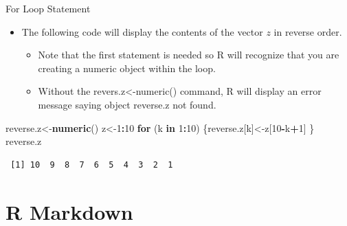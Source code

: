\documentclass[
  ignorenonframetext,
]{beamer}
\newenvironment{Shaded}{\begin{snugshade}}{\end{snugshade}}
\newcommand{\ControlFlowTok}[1]{\textcolor[rgb]{0.13,0.29,0.53}{\textbf{#1}}}
\newcommand{\DecValTok}[1]{\textcolor[rgb]{0.00,0.00,0.81}{#1}}
\newcommand{\FunctionTok}[1]{\textcolor[rgb]{0.13,0.29,0.53}{\textbf{#1}}}
\newcommand{\NormalTok}[1]{#1}
\newcommand{\OtherTok}[1]{\textcolor[rgb]{0.56,0.35,0.01}{#1}}
\newcommand{\SpecialCharTok}[1]{\textcolor[rgb]{0.81,0.36,0.00}{\textbf{#1}}}
\providecommand{\tightlist}{%
  \setlength{\itemsep}{0pt}\setlength{\parskip}{0pt}}
\begin{document}
\begin{frame}[fragile]{For Loop Statement}
\protect\hypertarget{for-loop-statement-2}{}
\begin{itemize}
\item
  The following code will display the contents of the vector \(z\) in
  reverse order.

  \begin{itemize}
  \tightlist
  \item
    Note that the first statement is needed so R will recognize that you
    are creating a numeric object within the loop.
  \item
    Without the revers.z\textless-numeric() command, R will display an
    error message saying object reverse.z not found.
  \end{itemize}
\end{itemize}

\small

\begin{Shaded}
\begin{Highlighting}[]
\NormalTok{reverse.z}\OtherTok{\textless{}{-}}\FunctionTok{numeric}\NormalTok{()}
\NormalTok{z}\OtherTok{\textless{}{-}}\DecValTok{1}\SpecialCharTok{:}\DecValTok{10}
\ControlFlowTok{for}\NormalTok{ (k }\ControlFlowTok{in} \DecValTok{1}\SpecialCharTok{:}\DecValTok{10}\NormalTok{)}
\NormalTok{\{reverse.z[k]}\OtherTok{\textless{}{-}}\NormalTok{z[}\DecValTok{10}\SpecialCharTok{{-}}\NormalTok{k}\SpecialCharTok{+}\DecValTok{1}\NormalTok{]}
\NormalTok{\}}
\NormalTok{reverse.z}
\end{Highlighting}
\end{Shaded}

\begin{verbatim}
 [1] 10  9  8  7  6  5  4  3  2  1
\end{verbatim}

\normalsize
\end{frame}

\hypertarget{r-markdown}{%
\section{R Markdown}\label{r-markdown}}
\end{document}
